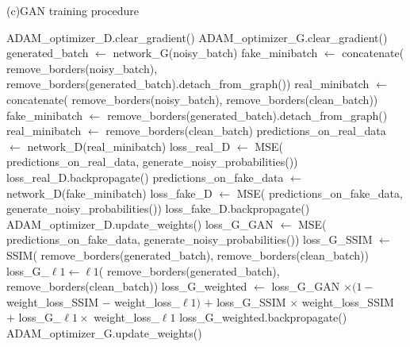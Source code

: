 \begin{algorithm}
\caption{(c)GAN training procedure}
\label{alg:gantrain}
\begin{algorithmic}
\STATE ADAM\_optimizer\_D.clear\_gradient()
\STATE ADAM\_optimizer\_G.clear\_gradient()
\STATE {}
\STATE generated\_batch $\leftarrow$ network\_G(noisy\_batch)
\STATE {}
\STATE fake\_minibatch $\leftarrow$ concatenate(
\STATE \quad remove\_borders(noisy\_batch),
\STATE \quad remove\_borders(generated\_batch).detach\_from\_graph())
\STATE real\_minibatch $\leftarrow$ concatenate(
\STATE \quad remove\_borders(noisy\_batch),
\STATE \quad remove\_borders(clean\_batch))
\ELSE
\STATE fake\_minibatch $\leftarrow$ remove\_borders(generated\_batch).detach\_from\_graph()
\STATE real\_minibatch $\leftarrow$ remove\_borders(clean\_batch)
\ENDIF
\STATE predictions\_on\_real\_data $\leftarrow$ network\_D(real\_minibatch)
\STATE loss\_real\_D $\leftarrow$ \ac{MSE}(
\STATE \quad predictions\_on\_real\_data,
\STATE \quad generate\_noisy\_probabilities(\TRUE))
\STATE loss\_real\_D.backpropagate()
\STATE predictions\_on\_fake\_data $\leftarrow$ network\_D(fake\_minibatch)
\STATE loss\_fake\_D $\leftarrow$ \ac{MSE}(
\STATE \quad predictions\_on\_fake\_data,
\STATE \quad generate\_noisy\_probabilities(\FALSE))
\STATE loss\_fake\_D.backpropagate()
\STATE {}
\STATE ADAM\_optimizer\_D.update\_weights()
\ENDIF
\STATE {}
\STATE loss\_G\_GAN $\leftarrow$ \ac{MSE}(
\STATE \quad predictions\_on\_fake\_data,
\STATE \quad generate\_noisy\_probabilities(\TRUE))
\STATE loss\_G\_SSIM $\leftarrow$ \ac{SSIM}(
\STATE \quad remove\_borders(generated\_batch),
\STATE \quad remove\_borders(clean\_batch))
\STATE loss\_G\_$\ell 1\leftarrow \ell 1$(
\STATE \quad remove\_borders(generated\_batch),
\STATE \quad remove\_borders(clean\_batch))
\STATE loss\_G\_weighted $\leftarrow$ 
\STATE \quad loss\_G\_GAN $\times (1- $ weight\_loss\_SSIM $-$ weight\_loss\_$\ell 1)$
\STATE \quad $+$ loss\_G\_SSIM $\times$ weight\_loss\_SSIM
\STATE \quad $+$ loss\_G\_$\ell 1 \times$ weight\_loss\_$\ell 1$
\STATE loss\_G\_weighted.backpropagate()
\STATE ADAM\_optimizer\_G.update\_weights()
\ENDFOR
\end{algorithmic}
\end{algorithm}
